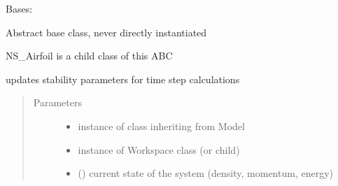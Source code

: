 \documentclass[letterpaper,10pt,english]{sphinxmanual}
\begin{document}
\begin{fulllineitems}
\label{\detokenize{autoapi/BoundaryConditioner/index:BoundaryConditioner.BoundaryConditioner}}
\sphinxAtStartPar
Bases: 

\sphinxAtStartPar
Abstract base class, never directly instantiated

\sphinxAtStartPar
NS\_Airfoil is a child class of this ABC

\begin{fulllineitems}
\label{\detokenize{autoapi/BoundaryConditioner/index:BoundaryConditioner.BoundaryConditioner.update_stability}}
\sphinxAtStartPar
updates stability parameters for time step calculations
\begin{quote}\begin{description}
\item[{Parameters}] \leavevmode\begin{itemize}
\item {} 
\sphinxAtStartPar
{} \textendash{} instance of class inheriting from Model

\item {} 
\sphinxAtStartPar
{} \textendash{} instance of Workspace class (or child)

\item {} 
\sphinxAtStartPar
{} ({\hyperref[\detokenize{autoapi/Field/index:Field.Field}]{}}) \textendash{} current state of the system (density, momentum, energy)

\end{itemize}

\end{description}\end{quote}

\end{fulllineitems}


\end{fulllineitems}
\end{document}
